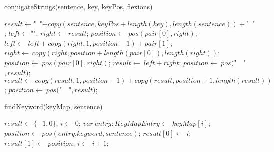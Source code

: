 \documentclass[a4paper,10pt]{article}
\begin{document}
\begin{algorithm}
\caption{conjugateStrings(sentence, key, keyPos, flexions)}
\begin{algorithmic}[5]

  \STATE \(result\gets\)"{}\ "{}\(+copy(sentence,keyPos+length(key),length(sentence))+\)"{}\ "{}\(\);
    \STATE \(left\gets\)"{}"{}\(\);
    \STATE \(right\gets\ result\);
    \STATE \(position\gets\ pos(pair[0],right)\);
      \STATE \(left\gets\ left+copy(right,1,position-1)+pair[1]\);
      \STATE \(right\gets\ copy(right,position+length(pair[0]),length(right))\);
      \STATE \(position\gets\ pos(pair[0],right)\);
    \ENDWHILE
    \STATE \(result\gets\ left+right\);
  \ENDFOR
  \STATE \(position\gets\ pos(\)"{}\ \ "{}\(,result)\);
    \STATE \(result\gets\ copy(result,1,position-1)+copy(result,position+1,length(result))\);
    \STATE \(position\gets\ pos(\)"{}\ \ "{}\(,result)\);
  \ENDWHILE

\end{algorithmic}
\end{algorithm}


\begin{algorithm}
\caption{findKeyword(keyMap, sentence)}
\begin{algorithmic}[5]

\STATE {}
\STATE {}
\STATE {}
\STATE {}
\STATE {}
\STATE {}
  \STATE \(result\gets\{-1,0\}\);
  \STATE \(i\gets\ 0\);
    \STATE \(var\ entry:KeyMapEntry\gets\ keyMap[i]\);
    \STATE \(position\gets\ pos(entry.keyword,sentence)\);
      \STATE \(result[0]\gets\ i\);
      \STATE \(result[1]\gets\ position\);
    \ENDIF
    \STATE \(i\gets\ i+1\);
  \ENDWHILE

\end{algorithmic}
\end{algorithm}
\end{document}
